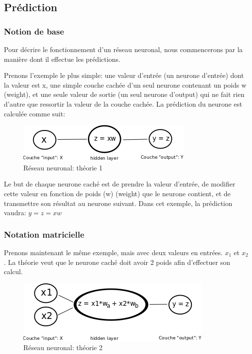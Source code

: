 \documentclass[11pt,a4paper]{report}
\begin{document}
  \subsection{Prédiction}

  \subsubsection{Notion de base}

    \par Pour décrire le fonctionnement d'un réseau neuronal, nous commencerons par la manière dont il effectue les prédictions. 
    
    \par Prenons l'exemple le plus simple: une valeur d'entrée (un neurone d'entrée) dont la valeur est x, une simple couche cachée d'un seul neurone contenant un poids w (weight), et une seule valeur de sortie (un seul neurone d'output) qui ne fait rien d'autre que ressortir la valeur de la couche cachée. La prédiction du neurone est calculée comme suit: 
    
    \begin{figure}[!h]
    \center
    \includegraphics[scale=0.74]{ressources/nn_theory_1.png}
    \caption{Réseau neuronal: théorie 1}
    \end{figure} 
    
    \par Le but de chaque neurone caché est de prendre la valeur d'entrée, de modifier cette valeur en fonction de poids (w) (weight) que le neurone contient, et de transmettre son résultat au neurone suivant. Dans cet exemple, la prédiction vaudra: $y = z = xw$

  \subsubsection{Notation matricielle}
    
    \par Prenons maintenant le même exemple, mais avec deux valeurs en entrées. $x_1$ et $x_2$. La théorie veut que le neurone caché doit avoir 2 poids afin d'effectuer son calcul. 
    
    \begin{figure}[!h]
    \center
    \includegraphics[scale=0.68]{ressources/nn_theory_2.png}
    \caption{Réseau neuronal: théorie 2}
    \end{figure} 
    
\end{document}

